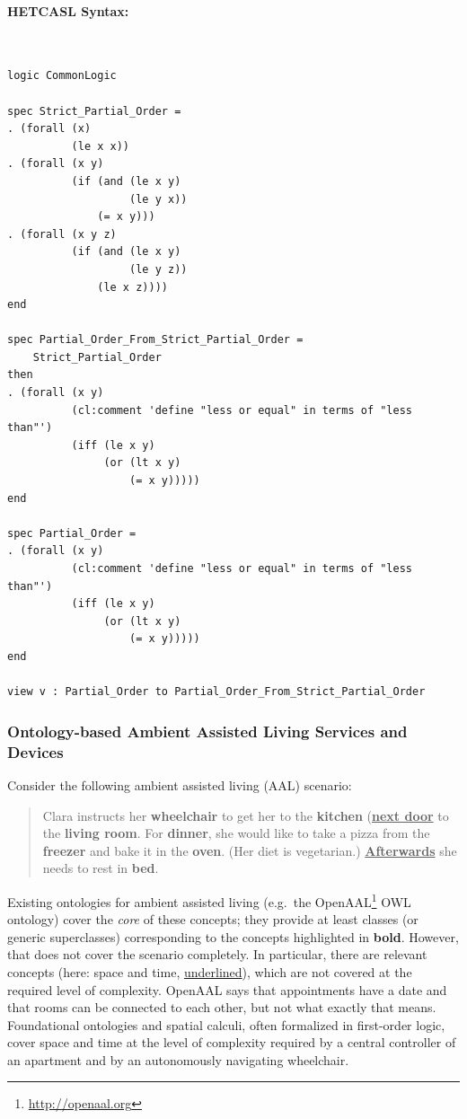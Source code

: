 \documentclass{article}
\newcommand{\normalTEXTSC}[2]{{#1\scriptsize#2}}
\newcommand{\HetCASL}{\normalTEXTSC{H}{ET}\normalTEXTSC{C}{ASL}\xspace}
\begin{document}
\paragraph{\HetCASL Syntax:}~\\
\begin{lstlisting}[language=hetcasl,morekeywords={forall,exists,and,not,if}]
logic CommonLogic

spec Strict_Partial_Order =
. (forall (x)
          (le x x))
. (forall (x y)
          (if (and (le x y)
                   (le y x))
              (= x y)))
. (forall (x y z)
          (if (and (le x y)
                   (le y z))
              (le x z))))
end

spec Partial_Order_From_Strict_Partial_Order =
    Strict_Partial_Order
then
. (forall (x y)
          (cl:comment 'define "less or equal" in terms of "less than"')
          (iff (le x y)
               (or (lt x y)
                   (= x y)))))
end

spec Partial_Order =
. (forall (x y)
          (cl:comment 'define "less or equal" in terms of "less than"')
          (iff (le x y)
               (or (lt x y)
                   (= x y)))))
end

view v : Partial_Order to Partial_Order_From_Strict_Partial_Order 
\end{lstlisting}

\subsubsection{Ontology-based Ambient Assisted Living Services and Devices}
\label{sec:aal-example}

Consider the following ambient assisted living (AAL) scenario:
\begin{quote}
  Clara instructs her \textbf{wheelchair} to get her to the \textbf{kitchen} (\textbf{\underline{next door}} to the \textbf{living room}.  For \textbf{dinner}, she would like to take a pizza from the \textbf{freezer} and bake it in the \textbf{oven}.  (Her diet is vegetarian.)  \textbf{\underline{Afterwards}} she needs to rest in \textbf{bed}.
\end{quote}
Existing ontologies for ambient assisted living (e.g.\ the OpenAAL\footnote{\url{http://openaal.org}} OWL ontology) cover the \emph{core} of these  concepts; they provide at least classes (or generic superclasses) corresponding to the concepts highlighted in \textbf{bold}.  However, that does not cover the scenario completely.  In particular, there are relevant concepts (here: space and time, \underline{underlined}), which are not covered at the required level of complexity.  OpenAAL says that appointments have a date and that rooms can be connected to each other, but not what exactly that means.  Foundational ontologies and spatial calculi, often formalized in first-order logic, cover space and time at the level of complexity required by a central controller of an apartment and by an autonomously navigating wheelchair.
\end{document}
